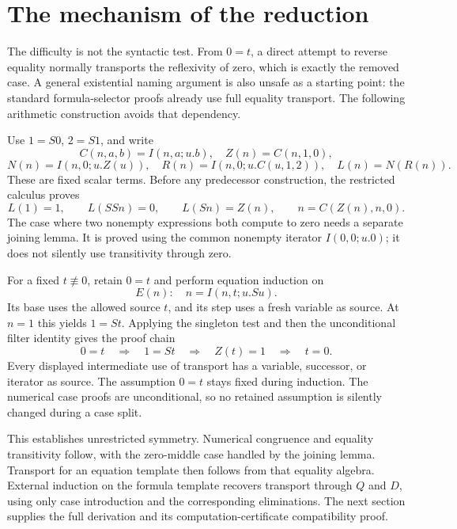 \documentclass[11pt]{article}
\theoremstyle{definition}\newtheorem{definition}[theorem]{Definition}
\theoremstyle{remark}\newtheorem{remark}[theorem]{Remark}
\newcommand{\synneq}{\not\equiv}
\begin{document}
\section{The mechanism of the reduction}
\label{sec:mechanism}

The difficulty is not the syntactic test. From $0=t$, a direct attempt to
reverse equality normally transports the reflexivity of zero, which is
exactly the removed case. A general existential naming argument is also
unsafe as a starting point: the standard formula-selector proofs already use
full equality transport. The following arithmetic construction avoids that
dependency.

Use $1=S0$, $2=S1$, and write
\[
 C(n,a,b)=I(n,a;u.b),\quad Z(n)=C(n,1,0),
\]
\[
 N(n)=I(n,0;u.Z(u)),\quad
 R(n)=I(n,0;u.C(u,1,2)),\quad L(n)=N(R(n)).
\]
These are fixed scalar terms. Before any predecessor construction, the
restricted calculus proves
\[
 L(1)=1,\qquad L(SSn)=0,\qquad L(Sn)=Z(n),\qquad
 n=C(Z(n),n,0).
\]
The case where two nonempty expressions both compute to zero needs a
separate joining lemma. It is proved using the common nonempty iterator
$I(0,0;u.0)$; it does not silently use transitivity through zero.

For a fixed $t\synneq0$, retain $0=t$ and perform equation induction on
\[
                     E(n):\quad n=I(n,t;u.Su).
\]
Its base uses the allowed source $t$, and its step uses a fresh variable as
source. At $n=1$ this yields $1=St$. Applying the singleton test and then the
unconditional filter identity gives the proof chain
\[
 \boxed{\quad 0=t\quad\Longrightarrow\quad1=St
     \quad\Longrightarrow\quad Z(t)=1
     \quad\Longrightarrow\quad t=0.\quad}
\]
Every displayed intermediate use of transport has a variable, successor,
or iterator as source. The assumption $0=t$ stays fixed during induction.
The numerical case proofs are unconditional, so no retained assumption is
silently changed during a case split.

This establishes unrestricted symmetry. Numerical congruence and equality
transitivity follow, with the zero-middle case handled by the joining lemma.
Transport for an equation template then follows from that equality algebra.
External induction on the formula template recovers transport through
$Q$ and $D$, using only case introduction and the corresponding eliminations.
The next section supplies the full derivation and its computation-certificate
compatibility proof.


\end{document}
